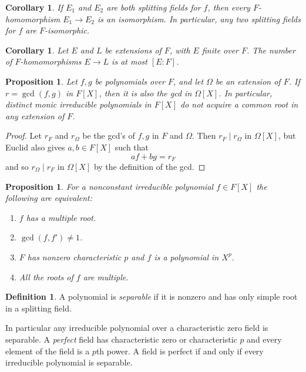 \documentclass[11pt]{amsart}
\newtheorem{prop}[theo]{Proposition}
\newtheorem{coro}[theo]{Corollary}
\theoremstyle{definition}
\newtheorem{defi}[theo]{Definition}
\begin{document}
\begin{coro}
If $E_1$ and $E_2$ are both splitting fields for $f$, then every $F$-homo\-morphism $E_1 \to E_2$ is an isomorphism.
In particular, any two splitting fields for $f$ are $F$-isomorphic.
\end{coro}


\begin{coro}
Let $E$ and $L$ be extensions of $F$, with $E$ finite over $F$.
The number of $F$-homomorphisms $E \to L$ is at most $[E : F]$.
\end{coro}


\begin{prop}
Let $f,g$ be polynomials over $F$, and let $\Omega$ be an extension of $F$.
If $r = \gcd(f,g)$ in $F[X]$, then it is also the gcd in $\Omega[X]$.
In particular, distinct monic irreducible polynomials in $F[X]$ do not acquire a common root in any extension of $F$.
\end{prop}

\begin{proof}
Let $r_F$ and $r_\Omega$ be the gcd's of $f,g$ in $F$ and $\Omega$.
Then $r_F \mid r_\Omega$ in $\Omega[X]$, but Euclid also gives $a,b \in F[X]$ such that
\[
a f + b g = r_F
\]
and so $r_\Omega \mid r_F$ in $\Omega[X]$ by the definition of the gcd.
\end{proof}


\begin{prop}
For a nonconstant irreducible polynomial $f \in F[X]$ the following are equivalent:
\begin{enumerate}
\item
$f$ has a multiple root.

\item
$\gcd(f, f') \not=1$.

\item
$F$ has nonzero characteristic $p$ and $f$ is a polynomial in $X^p$.

\item
All the roots of $f$ are multiple.
\end{enumerate}
\end{prop}


\begin{defi}
A polynomial is \emph{separable} if it is nonzero and has only simple root in a splitting field.
\end{defi}

In particular any irreducible polynomial over a characteristic zero field is separable.
A \emph{perfect} field has characteristic zero or characteristic $p$ and every element of the field is a $p$th power.
A field is perfect if and only if every irreducible polynomial is separable.
\end{document}

